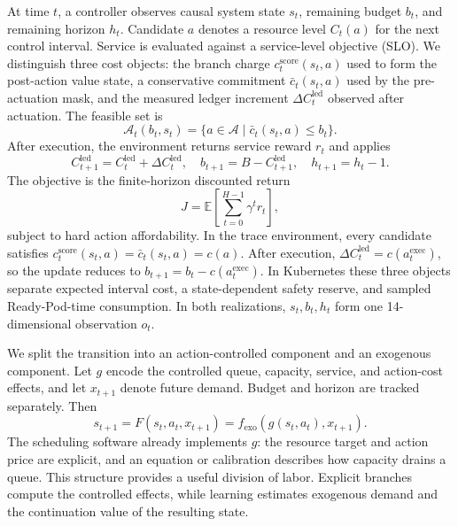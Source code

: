 \documentclass[acmsmall,screen,review,anonymous]{acmart}
\begin{document}
At time \(t\), a controller observes causal system state \(s_t\), remaining
budget \(b_t\), and remaining horizon \(h_t\).  Candidate \(a\) denotes a
resource level \(C_t(a)\) for the next control interval. Service is evaluated
against a service-level objective (SLO). We distinguish three
cost objects: the branch charge \(c_t^{\mathrm{score}}(s_t,a)\) used to form the
post-action value state, a conservative commitment
\(\bar c_t(s_t,a)\) used by the pre-actuation mask, and the measured ledger
increment \(\Delta C_t^{\mathrm{led}}\) observed after actuation.  The feasible
set is
\begin{equation}
  \mathcal A_t(b_t,s_t)=
  \{a\in\mathcal A\mid \bar c_t(s_t,a)\le b_t\}.
\end{equation}
After execution, the environment returns service reward \(r_t\) and applies
\begin{equation}
  C_{t+1}^{\mathrm{led}}=C_t^{\mathrm{led}}+\Delta C_t^{\mathrm{led}},
  \quad b_{t+1}=B-C_{t+1}^{\mathrm{led}}, \quad h_{t+1}=h_t-1.
\end{equation}
The objective is the finite-horizon discounted return
\begin{equation}
  J=\mathbb E\!\left[\sum_{t=0}^{H-1}\gamma^t r_t\right],
\end{equation}
subject to hard action affordability.  In the trace environment, every
candidate satisfies
\(c_t^{\mathrm{score}}(s_t,a)=\bar c_t(s_t,a)=c(a)\).  After execution,
\(\Delta C_t^{\mathrm{led}}=c(a_t^{\mathrm{exec}})\), so the update reduces to
\(b_{t+1}=b_t-c(a_t^{\mathrm{exec}})\).  In Kubernetes these three objects
separate expected interval cost, a state-dependent safety reserve, and sampled
Ready-Pod-time consumption.  In both realizations, \(s_t,b_t,h_t\) form one
14-dimensional observation \(o_t\).

We split the transition into an action-controlled component and an exogenous
component.  Let \(g\) encode the controlled queue, capacity, service, and action-cost
effects, and let \(x_{t+1}\) denote future demand. Budget and horizon are
tracked separately.  Then
\begin{equation}
  s_{t+1}=F(s_t,a_t,x_{t+1})
  =f_{\mathrm{exo}}\!\left(g(s_t,a_t),x_{t+1}\right).
\end{equation}
The scheduling software already implements \(g\): the resource target and
action price are explicit, and an equation or calibration describes how
capacity drains a queue. This structure provides a useful division of labor.
Explicit branches compute the controlled effects, while learning estimates
exogenous demand and the continuation value of the resulting state.
\end{document}
